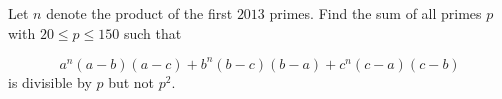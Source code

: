 Let $n$ denote the product of the first $2013$ primes.  Find the sum of all primes $p$ with $20 \le p \le 150$ such that
\begin{enumerate}[(i)]
\[ a^n(a-b)(a-c) + b^n(b-c)(b-a) + c^n(c-a)(c-b) \]
is divisible by $p$ but not $p^2$.
\end{enumerate}
